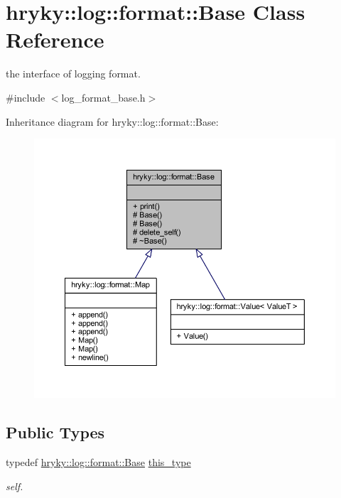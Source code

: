 \hypertarget{classhryky_1_1log_1_1format_1_1_base}{\section{hryky\-:\-:log\-:\-:format\-:\-:Base Class Reference}
\label{classhryky_1_1log_1_1format_1_1_base}
}


the interface of logging format.  




{\ttfamily \#include $<$log\-\_\-format\-\_\-base.\-h$>$}



Inheritance diagram for hryky\-:\-:log\-:\-:format\-:\-:Base\-:\nopagebreak
\begin{figure}[H]
\begin{center}
\leavevmode
\includegraphics[width=350pt]{classhryky_1_1log_1_1format_1_1_base__inherit__graph}
\end{center}
\end{figure}
\subsection*{Public Types}
\begin{DoxyCompactItemize}
\item 
\hypertarget{classhryky_1_1log_1_1format_1_1_base_acacc58d55c7531c1cc87f81b8578d7da}{typedef \hyperlink{classhryky_1_1log_1_1format_1_1_base}{hryky\-::log\-::format\-::\-Base} \hyperlink{classhryky_1_1log_1_1format_1_1_base_acacc58d55c7531c1cc87f81b8578d7da}{this\-\_\-type}}\label{classhryky_1_1log_1_1format_1_1_base_acacc58d55c7531c1cc87f81b8578d7da}

\begin{DoxyCompactList}\small\item\em self. \end{DoxyCompactList}\end{DoxyCompactItemize}
